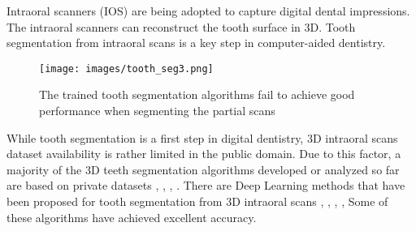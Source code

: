 \documentclass[letterpaper, 10 pt, conference]{ieeeconf}  %
\begin{document}
Intraoral scanners (IOS) are being adopted to capture digital dental impressions. %
The intraoral scanners can reconstruct the tooth surface in 3D. %
Tooth segmentation from intraoral scans is a key step in computer-aided dentistry.
\begin{figure*}[htbp]
\centering
\texttt{[image: images/tooth\_seg3.png]}
\caption{The trained tooth segmentation algorithms fail to achieve good performance when segmenting the partial scans}
\label{fig:compareSingleTooth1}
\end{figure*}
While tooth segmentation is a first step in digital dentistry, 3D intraoral scans dataset availability is rather limited in the public domain. Due to this factor, a majority of the 3D teeth segmentation algorithms developed or analyzed so far are based on private datasets \cite{xu20183d}, %
\cite{yuan2010single}, \cite{wu2014tooth}, \cite{jana2023automatic}. There are Deep Learning methods that have been proposed for tooth segmentation from 3D intraoral scans \cite{lian2020deep}, \cite{zhao20213d}, \cite{li2022multi}, \cite{zhang2021tsgcnet}, \cite{jana20233d} Some of these algorithms have achieved excellent accuracy.  
\end{document}
